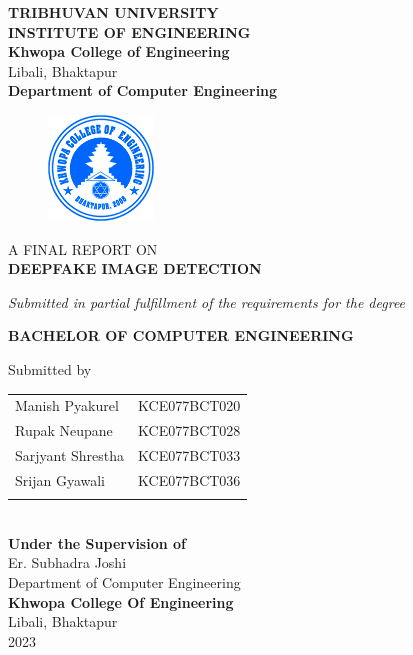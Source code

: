 \begin{center}
	\thispagestyle{empty}
	\Large\textbf{TRIBHUVAN UNIVERSITY}\\
	\Large\textbf{INSTITUTE OF ENGINEERING }\\
	\vspace{0.4in}
	\large{\textbf{Khwopa College of Engineering}\\}
	\normalsize{Libali, Bhaktapur\\}
	\large\textbf{Department of Computer Engineering}
	\vspace{0.3in}
	\begin{figure}[h]
			\centering
				\includegraphics[width=0.25\textwidth]{img/Khwopalogo.jpg}
	\end{figure}
	
	\vspace{0.4in}
	\large{A FINAL REPORT ON\\\textbf{\MakeUppercase{DeepFake Image Detection}}\\}
	
	\vspace{0.3in}
	\large{\textit{Submitted in partial fulfillment of the requirements for the degree\\}}
	
	\vspace{0.3in}
	\large{\textbf{BACHELOR OF COMPUTER ENGINEERING}\\}
	
	\vspace{0.4in}
	\large{Submitted by}\\
	\begin{tabular}{p{3.5in}p{3in}}
		\hspace{0.3cm}Manish Pyakurel & KCE077BCT020\\
		\hspace{0.3cm}Rupak Neupane & KCE077BCT028\\
		\hspace{0.3cm}Sarjyant Shrestha & KCE077BCT033\\
		\hspace{0.3cm}Srijan Gyawali & KCE077BCT036\\
	 \vspace{0.3in}
	\end{tabular}
	\\
	\large{\textbf{Under the Supervision of}}\\
		\normalsize{Er. Subhadra Joshi\\
		Department of Computer Engineering}\\ 

	\vspace{1cm}
	\large{\textbf{Khwopa College Of Engineering}\\}
		\normalsize{Libali, Bhaktapur\\
		2023
	}
\end{center}
